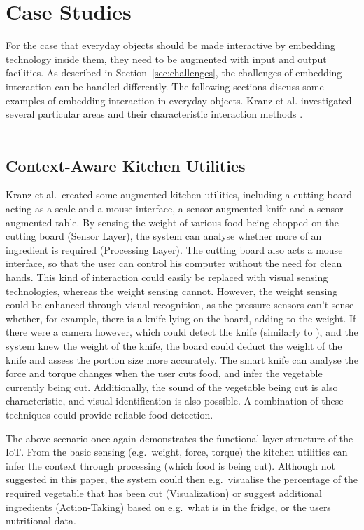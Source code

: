 \section{Case Studies}
\label{sec:caseStudies}
For the case that everyday objects should be made interactive by embedding technology inside them, they need to be augmented with input and output facilities.
As described in Section~\ref{sec:challenges}, the challenges of embedding interaction can be handled differently.
The following sections discuss some examples of embedding interaction in everyday objects.
Kranz et al. investigated several particular areas and their characteristic interaction methods \cite{kranz10}.
\\
\\
\subsection{Context-Aware Kitchen Utilities}
Kranz et al.\ created some augmented kitchen utilities, including a cutting board acting as a scale and a mouse interface, a sensor augmented knife and a sensor augmented table.
By sensing the weight of various food being chopped on the cutting board (Sensor Layer), the system can analyse whether more of an ingredient is required (Processing Layer).
The cutting board also acts a mouse interface, so that the user can control his computer without the need for clean hands.
This kind of interaction could easily be replaced with visual sensing technologies, whereas the weight sensing cannot.
However, the weight sensing could be enhanced through visual recognition, as the pressure sensors can't sense whether, for example, there is a knife lying on the board, adding to the weight.
If there were a camera however, which could detect the knife (similarly to \cite{corsten13}), and the system knew the weight of the knife, the board could deduct the weight of the knife and assess the portion size more accurately.
The smart knife can analyse the force and torque changes when the user cuts food, and infer the vegetable currently being cut.
Additionally, the sound of the vegetable being cut is also characteristic, and visual identification is also possible.
A combination of these techniques could provide reliable food detection.

The above scenario once again demonstrates the functional layer structure of the IoT.
From the basic sensing (e.g.\ weight, force, torque) the kitchen utilities can infer the context through processing (which food is being cut).
Although not suggested in this paper, the system could then e.g.\ visualise the percentage of the required vegetable that has been cut (Visualization) or suggest additional ingredients (Action-Taking) based on e.g.\ what is in the fridge, or the users nutritional data.


